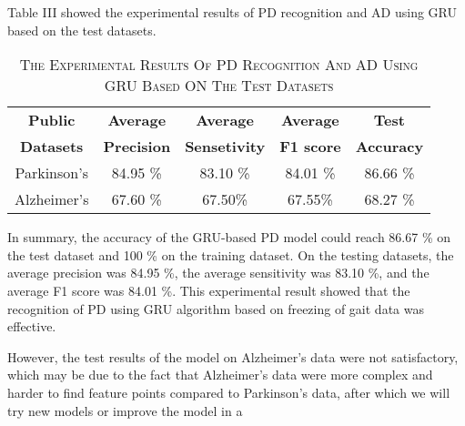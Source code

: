 \par
Table III showed the experimental results of PD recognition and AD using GRU based on the test datasets.
\begin{center}
   \begin{table}[!h]
       \centering
        \footnotesize{
       \caption{\footnotesize\textsc{The Experimental Results Of PD Recognition And AD
Using GRU Based ON The Test Datasets\\}}
       \begin{tabular}{|c|c|c|c|c|}
       \hline
            \textbf{Public} &  \textbf{Average} & \textbf{Average} &\textbf{Average}&\textbf{Test}\\
            \textbf{Datasets} &  \textbf{Precision} & \textbf{Sensetivity} &\textbf{F1 score}&\textbf{Accuracy}\\
            \hline
            Parkinson’s & 84.95 \% &83.10 \%& 84.01 \% & 86.66 \%\\
            \hline
            Alzheimer's & 67.60 \% & 67.50\% & 67.55\% & 68.27 \%\\
            \hline
       \end{tabular} }
   \end{table}
\end{center}
\par
In summary, the accuracy of the GRU-based PD model
could reach 86.67 \% on the test dataset and 100 \%
on the training dataset. On the testing datasets, the
average precision was 84.95 \%, the average sensitivity
was 83.10 \%, and the average F1 score was 84.01 \%.
This experimental result showed that the recognition of
PD using GRU algorithm based on freezing of gait data
was effective.
\par
However, the test results of the model on Alzheimer’s
data were not satisfactory, which may be due to the fact
that Alzheimer’s data were more complex and harder to
find feature points compared to Parkinson’s data, after
which we will try new models or improve the model in a



